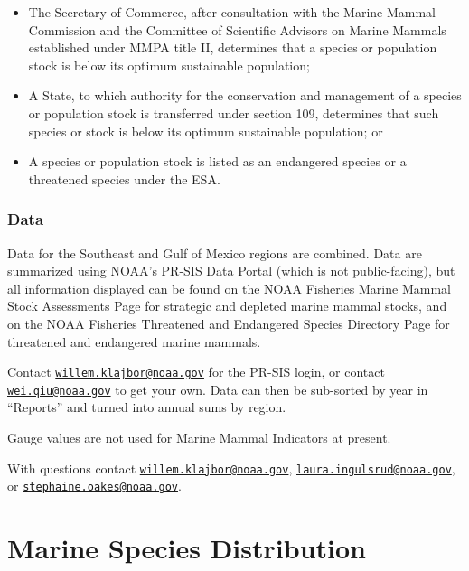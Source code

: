 \documentclass[
]{book}
\begin{document}
\begin{itemize}
\item
  The Secretary of Commerce, after consultation with the Marine Mammal Commission and the Committee of Scientific Advisors on Marine Mammals established under MMPA title II, determines that a species or population stock is below its optimum sustainable population;
\item
  A State, to which authority for the conservation and management of a species or population stock is transferred under section 109, determines that such species or stock is below its optimum sustainable population; or
\item
  A species or population stock is listed as an endangered species or a threatened species under the ESA.
\end{itemize}

\hypertarget{data-5}{%
\subsection{Data}\label{data-5}}

Data for the Southeast and Gulf of Mexico regions are combined. Data are summarized using NOAA's PR-SIS Data Portal (which is not public-facing), but all information displayed can be found on the NOAA Fisheries Marine Mammal Stock Assessments Page for strategic and depleted marine mammal stocks, and on the NOAA Fisheries Threatened and Endangered Species Directory Page for threatened and endangered marine mammals.

Contact \href{mailto:willem.klajbor@noaa.gov}{\nolinkurl{willem.klajbor@noaa.gov}} for the PR-SIS login, or contact \href{mailto:wei.qiu@noaa.gov}{\nolinkurl{wei.qiu@noaa.gov}} to get your own. Data can then be sub-sorted by year in ``Reports'' and turned into annual sums by region.

Gauge values are not used for Marine Mammal Indicators at present.

With questions contact \href{mailto:willem.klajbor@noaa.gov}{\nolinkurl{willem.klajbor@noaa.gov}}, \href{mailto:laura.ingulsrud@noaa.gov}{\nolinkurl{laura.ingulsrud@noaa.gov}}, or \href{mailto:stephaine.oakes@noaa.gov}{\nolinkurl{stephaine.oakes@noaa.gov}}.

\hypertarget{marine-species-distribution}{%
\chapter{Marine Species Distribution}\label{marine-species-distribution}}
\end{document}

